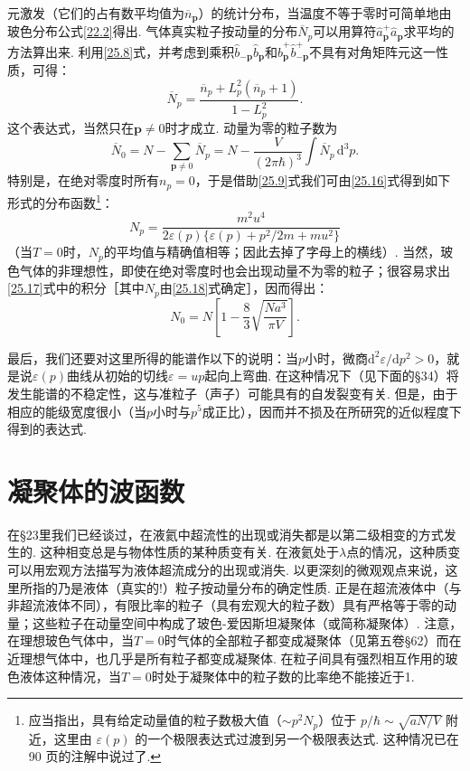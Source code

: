 元激发（它们的占有数平均值为$\overline{n}_{\bm{p}}$）的统计分布，当温度不等于零时可简单地由玻色分布公式\eqref{22.2}得出. 气体真实粒子按动量的分布$\overline{N}_{p}$可以用算符$\hat{a}^{+}_{\bm{p}}\hat{a}_{\bm{p}}$求平均的方法算出来. 利用\eqref{25.8}式，并考虑到乘积$\hat{b}_{-\bm{p}}\hat{b}_{\bm{p}}$和$\hat{b}^{+}_{\bm{p}}\hat{b}^{+}_{-\bm{p}}$不具有对角矩阵元这一性质，可得：
\begin{equation}
\overline{N}_{p}=\frac{\overline{n}_{p}+L^{2}_{p}(\overline{n}_{p}+1)}{1-L^{2}_{p}}.
\label{25.16}
\end{equation}
这个表达式，当然只在$\bm{p}\neq 0$时才成立. 动量为零的粒子数为
\begin{equation}
\overline{N}_{0}=N-\sum_{\bm{p}\neq 0}\overline{N}_{p}
=N-\frac{V}{(2\pi\hbar)^{3}}\int\overline{N}_{p}\,\mathrm{d}^{3}p.
\label{25.17}
\end{equation}
特别是，在绝对零度时所有$n_{p}=0$，于是借助\eqref{25.9}式我们可由\eqref{25.16}式得到如下形式的分布函数\footnote{应当指出，具有给定动量值的粒子数极大值（$\sim p^{2}N_{p}$）位于 $p/\hbar\sim\sqrt{aN/V}$ 附近，这里由 $\varepsilon(p)$ 的一个极限表达式过渡到另一个极限表达式. 这种情况已在 90 页的注解中说过了.}：
\begin{equation}
N_{p}=\frac{m^{2}u^{4}}{2\varepsilon(p)\bigl\{\varepsilon(p)+p^{2}/2m+mu^{2}\bigr\}}
\label{25.18}
\end{equation}
（当$T=0$时，$N_{p}$的平均值与精确值相等；因此去掉了字母上的横线）. 当然，玻色气体的非理想性，即使在绝对零度时也会出现动量不为零的粒子；很容易求出\eqref{25.17}式中的积分［其中$N_{p}$由\eqref{25.18}式确定］，因而得出：
\begin{equation}
N_{0}=N\left[1-\frac{8}{3}\sqrt{\frac{Na^{3}}{\pi V}}\right].
\label{25.19}
\end{equation}

最后，我们还要对这里所得的能谱作以下的说明：当$p$小时，微商$\mathrm{d}^{2}\varepsilon/\mathrm{d}p^{2}>0$，就是说$\varepsilon(p)$曲线从初始的切线$\varepsilon=up$起向上弯曲. 在这种情况下（见下面的§34）将发生能谱的不稳定性，这与准粒子（声子）可能具有的自发裂变有关. 但是，由于相应的能级宽度很小（当$p$小时与$p^{5}$成正比），因而并不损及在所研究的近似程度下得到的表达式.

\section{凝聚体的波函数}

在§23里我们已经谈过，在液氦中超流性的出现或消失都是以第二级相变的方式发生的. 这种相变总是与物体性质的某种质变有关. 在液氦处于$\lambda$点的情况，这种质变可以用宏观方法描写为液体超流成分的出现或消失. 以更深刻的微观观点来说，这里所指的乃是液体（真实的!）粒子按动量分布的确定性质. 正是在超流液体中（与非超流液体不同），有限比率的粒子（具有宏观大的粒子数）具有严格等于零的动量；这些粒子在动量空间中构成了玻色-爱因斯坦凝聚体（或简称凝聚体）. 注意，在理想玻色气体中，当$T=0$时气体的全部粒子都变成凝聚体（见第五卷§62）而在近理想气体中，也几乎是所有粒子都变成凝聚体. 在粒子间具有强烈相互作用的玻色液体这种情况，当$T=0$时处于凝聚体中的粒子数的比率绝不能接近于1.

